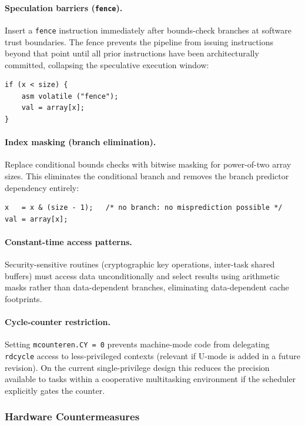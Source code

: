 \paragraph{Speculation barriers (\texttt{fence}).}
Insert a \texttt{fence} instruction immediately after bounds-check branches at
software trust boundaries.  The fence prevents the pipeline from issuing
instructions beyond that point until all prior instructions have been architecturally
committed, collapsing the speculative execution window:

\begin{verbatim}
if (x < size) {
    asm volatile ("fence");
    val = array[x];
}
\end{verbatim}

\paragraph{Index masking (branch elimination).}
Replace conditional bounds checks with bitwise masking for power-of-two array sizes.
This eliminates the conditional branch and removes the branch predictor dependency
entirely:

\begin{verbatim}
x   = x & (size - 1);   /* no branch: no misprediction possible */
val = array[x];
\end{verbatim}

\paragraph{Constant-time access patterns.}
Security-sensitive routines (cryptographic key operations, inter-task shared
buffers) must access data unconditionally and select results using arithmetic masks
rather than data-dependent branches, eliminating data-dependent cache footprints.

\paragraph{Cycle-counter restriction.}
Setting \texttt{mcounteren.CY~=~0} prevents machine-mode code from delegating
\texttt{rdcycle} access to less-privileged contexts (relevant if U-mode is added in
a future revision).  On the current single-privilege design this reduces the
precision available to tasks within a cooperative multitasking environment if the
scheduler explicitly gates the counter.

\subsubsection{Hardware Countermeasures}

